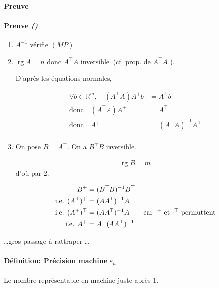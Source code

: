 \documentclass{article}
\newcommand{\rg}{\operatorname{rg}}
\newcommand{\R}{\mathbb{R}}
\renewcommand{\epsilon}{\varepsilon}
\newenvironment{proof}[1][\unskip]{
	\def\temp{#1}\ifx\temp\empty
		\paragraph{Preuve}
	\else
		\paragraph{Preuve \emph{(#1)}}
	\fi

}{}
\newenvironment{definition}[1][\unskip]{
	\paragraph{Définition: #1}

}{}
\begin{document}
\begin{proof}
   \begin{enumerate}
       \item $A^{-1}$ vérifie $(MP)$
        \item $\rg A = n$ donc $A^\top A$ inversible. (cf. prop. de $A^\top A$ ).

            D'après les équations normales, 

            \begin{align*}
                \forall b\in \R^m,\quad (A^\top A) A ^+ b &= A^\top b \\
                \text{donc}\quad (A^\top A) A^+ &= A^\top  \\
                \text{donc}\quad A^+ &= (A^\top A)^{-1} A^\top  \\
            \end{align*}

        \item On pose $B = A^\top $. On a $B^\top B$ inversible.

            \begin{align*}
                \rg B = m
            \end{align*}
            d'où par 2.

            \begin{align*}
                B^+ &= (B^\top B)^{-1} B^\top \\
                \text{i.e. }(A^\top )^+ &= (A A^\top )^{-1} A \\
                \text{i.e. }(A^{+})^\top &= (A A^\top )^{-1} A \quad&\text{car $ \cdot ^+$ et $ \cdot ^\top $ permuttent} \\
                \text{i.e. }A^+ &= A^\top  (A A^\top )^{-1} \\
            \end{align*}
   \end{enumerate} 
\end{proof}

\ldots gros passage à rattraper \ldots

\begin{definition}[Précision machine $\epsilon_n$ ]
    Le nombre représentable en machine juste après 1.
\end{definition}
\end{document}
